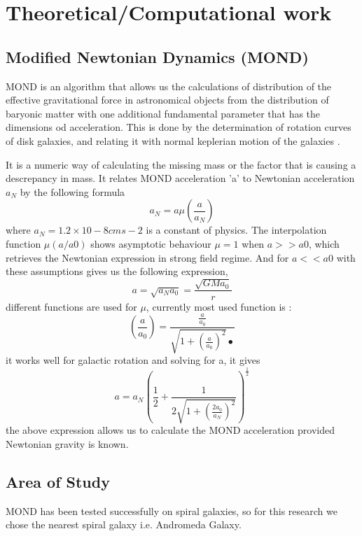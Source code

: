   \chapter{Theoretical/Computational work}
  
\section{Modified Newtonian Dynamics (MOND)}

MOND is an algorithm that allows us the calculations of distribution of the effective gravitational force in astronomical objects from the distribution of baryonic matter with one additional fundamental parameter that has the dimensions od acceleration. This  is done by the determination of rotation curves of disk galaxies, and relating it with normal keplerian motion of the galaxies \cite{dm_2}.

 It is a numeric way of calculating the missing mass or the factor that is causing a descrepancy in mass. It relates MOND acceleration 'a' to Newtonian acceleration $a_{N}$ by the following formula \begin{equation}
 a_{N}= a\mu(\frac{a}{a_{N}})
\end{equation}
where $a_{N} = 1.2×10-8  cms-2$  is a constant of physics.
The interpolation function $\mu (a/a0)$ shows asymptotic behaviour $\mu=1$ when $a>> a0$,  which retrieves the Newtonian expression in strong field regime. And for $a << a0$ with these assumptions gives us the following expression,
\begin{equation}
a= \sqrt{a_{N}a_{0}}= \frac{\sqrt{GMa_{0}}}{r}
\end{equation}
different functions are used for $\mu$, currently most used function is :
\begin{equation}
(\frac{a}{a_{0}}) = \frac{\frac{a}{a_{0}}}{\sqrt{1+(\frac{a}{a_{0}})^2}•}
\end{equation}
it works well for galactic rotation and solving for a, it gives
\begin{equation}
a= a_{N}(\frac{1}{2}+\frac{1}{2\sqrt{1+(\frac{2a_{0}}{a_{N}})^2}})^\frac{1}{2}
\end{equation}
the above expression allows us to calculate the MOND acceleration provided Newtonian gravity is known.

\section{Area of Study}
  MOND has been tested successfully on spiral galaxies, so for this research we chose the nearest spiral galaxy i.e. Andromeda Galaxy. 

